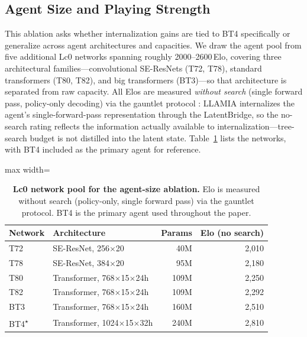 \subsection{Agent Size and Playing Strength}
\label{sec:app_abl_agent_size_playing_strength}

This ablation asks whether internalization gains are tied to BT4 specifically or generalize across agent architectures and capacities. We draw the agent pool from five additional Lc0 networks spanning roughly 2000--2600\,Elo, covering three architectural families---convolutional SE-ResNets (T72, T78), standard transformers (T80, T82), and big transformers (BT3)---so that architecture is separated from raw capacity. All Elos are measured \emph{without search} (single forward pass, policy-only decoding) via the gauntlet protocol : LLAMIA internalizes the agent's single-forward-pass representation through the LatentBridge, so the no-search rating reflects the information actually available to internalization---tree-search budget is not distilled into the latent state. Table~\ref{tab:lc0_crosscheck} lists the networks, with BT4 included as the primary agent for reference.

\begin{table}[h]
\centering
\setlength{\tabcolsep}{5pt}
\caption{%
  \textbf{Lc0 network pool for the agent-size ablation.}
  Elo is measured without search (policy-only, single forward pass) via the
  gauntlet protocol.
  BT4 is the primary agent used throughout the paper.
}
\label{tab:lc0_crosscheck}
\begin{adjustbox}{max width=\columnwidth}
\renewcommand{\arraystretch}{1.3}
\small
\begin{tabular}{llrr}
\toprule[1.2pt]
\textbf{Network} & \textbf{Architecture} & \textbf{Params}
  & \textbf{Elo (no search)} \\
\midrule
T72   & SE-ResNet, 256$\times$20  & 40M  & 2{,}010 \\
T78   & SE-ResNet, 384$\times$20  & 95M  & 2{,}180 \\
T80   & Transformer, 768$\times$15$\times$24h  & 109M & 2{,}250 \\
T82   & Transformer, 768$\times$15$\times$24h  & 109M & 2{,}292 \\
BT3   & Transformer, 768$\times$15$\times$24h  & 160M & 2{,}510 \\
\midrule
BT4\textsuperscript{$\star$}
      & Transformer, 1024$\times$15$\times$32h & 240M & 2{,}810 \\
\bottomrule[1.2pt]
\end{tabular}
\end{adjustbox}
\end{table}


